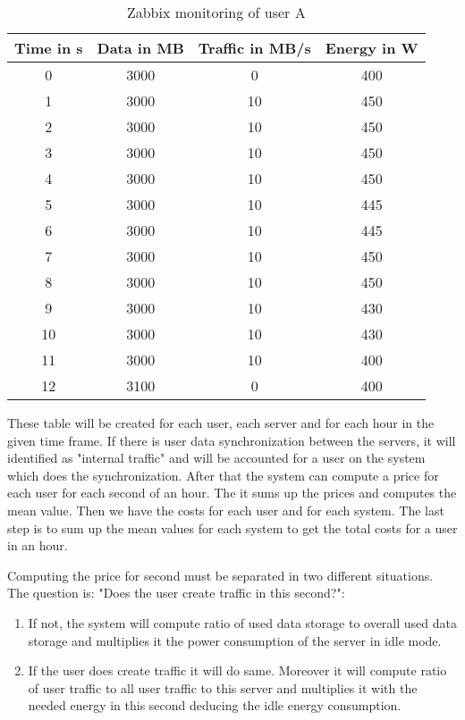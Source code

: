  
 \begin{table}
 \centering
 \caption{Zabbix monitoring of user A}
 \begin{tabular}{|c|c|c|c|}
  \hline Time in s & Data in MB & Traffic in MB/s & Energy in W \\ 
   \hline 0 & 3000 & 0 & 400 \\ 
  \hline 1 & 3000 & 10 & 450 \\ 
  \hline 2 & 3000 & 10 & 450 \\ 
  \hline 3 & 3000 & 10 & 450\\ 
  \hline 4 & 3000 & 10 & 450 \\ 
  \hline 5 & 3000 & 10 & 445 \\
  \hline 6 & 3000 & 10 & 445 \\ 
  \hline 7 & 3000 & 10 & 450\\ 
  \hline 8 & 3000 & 10 & 450 \\ 
  \hline 9 & 3000 & 10 & 430 \\  
  \hline 10 & 3000 & 10 & 430 \\
   \hline 11 & 3000 & 10 & 400 \\
  \hline 12 & 3100 & 0 & 400 \\  
  \hline 
  \end{tabular}
  \label{tb2} 
  \end{table}
  
  These table will be created for each user, each server and for each hour in the given time frame. If there is user data synchronization between the servers, it will identified as "internal traffic" and will be accounted for a user on the system which does the synchronization. After that the system can compute a price for each user for each second of an hour. The it sums up the prices and computes the mean value. Then we have the costs for each user and for each system. The last step is to sum up the mean values for each system to get the total costs for a user in an hour.
  
  Computing the price for second must be separated in two different situations. The question is: "Does the user create traffic in this second?":
  \begin{enumerate}
	\item
	If not, the system will compute ratio of used data storage to overall used data storage and multiplies it the power consumption of the server in idle mode.
	\item
	If the user does create traffic it will do same. Moreover it will compute ratio of user traffic to all user traffic to this server and multiplies it with the needed energy in this second deducing the idle energy consumption.
  \end{enumerate}
  
